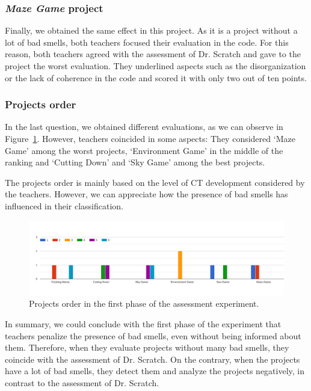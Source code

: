 \subsubsection{\textit{Maze Game} project}
\label{subsub:maze_game}

Finally, we obtained the same effect in this project. As it is a project without a lot of bad smells, both teachers focused their evaluation in the code. For this reason, both teachers agreed with the assessment of Dr. Scratch and gave to the project the worst evaluation. They underlined aspects such as the disorganization or the lack of coherence in the code and scored it with only two out of ten points.

\subsubsection{Projects order}
\label{subsub:projects_order_phase_1}

In the last question, we obtained different evaluations, as we can observe in Figure~\ref{fig:projects_order_1}. However, teachers coincided in some aspects: They considered `Maze Game' among the worst projects, `Environment Game' in the middle of the ranking and `Cutting Down' and `Sky Game' among the best projects. 

The projects order is mainly based on the level of CT development considered by the teachers. However, we can appreciate how the presence of bad smells has influenced in their classification. 


\begin{figure}
    \centering
    \includegraphics[width=16cm,                         keepaspectratio]{img/order_projects_1.png}
    \caption{Projects order in the first phase of the assessment experiment.}
    \label{fig:projects_order_1}
\end{figure}


\hfill

In summary, we could conclude with the first phase of the experiment that teachers penalize the presence of bad smells, even without being informed about them. Therefore, when they evaluate projects without many bad smells, they coincide with the assessment of Dr. Scratch. On the contrary, when the projects have a lot of bad smells, they detect them and analyze the projects negatively, in contrast to the assessment of Dr. Scratch. 

